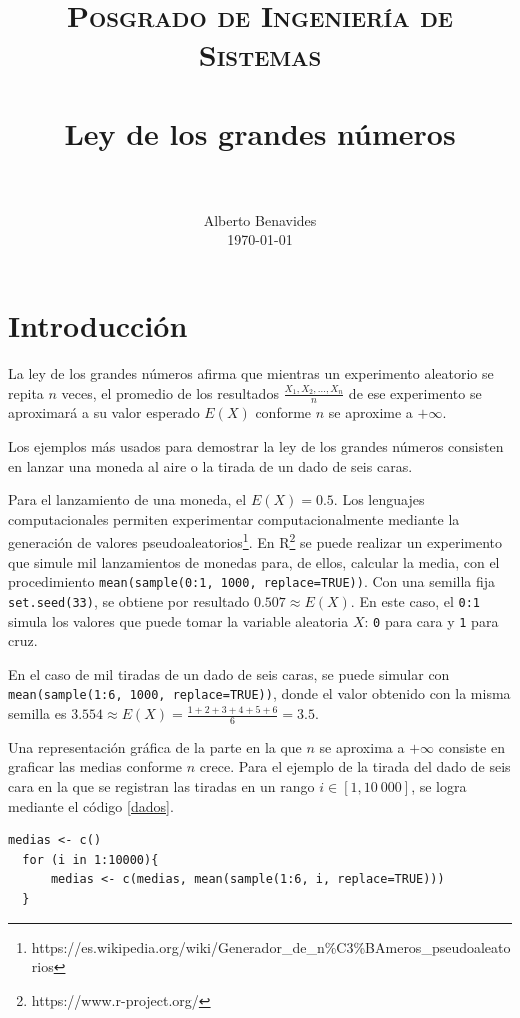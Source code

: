 \documentclass[paper=leter, fontsize=11pt]{scrartcl}
\title{
		\usefont{OT1}{bch}{b}{n}
		\normalfont \normalsize \textsc{Posgrado de Ingeniería de Sistemas} \\ [25pt]
		\horrule{0.5pt} \\[0.4cm]
		\huge Ley de los grandes números \\
		\horrule{2pt} \\[0.5cm]
}
\author{
		\normalfont 								\normalsize
        Alberto Benavides\\[-3pt]		\normalsize
        \today
}
\date{}
\begin{document}
 
\maketitle

\section{Introducción}

La ley de los grandes números afirma que mientras un experimento aleatorio se repita $n$ veces, el promedio de los resultados $\frac{X_1, X_2, \ldots, X_n}{n}$ de ese experimento se aproximará a su valor esperado $E(X)$ conforme $n$ se aproxime a $+\infty$.

Los ejemplos más usados para demostrar la ley de los grandes números consisten en lanzar una moneda al aire o la tirada de un dado de seis caras.

Para el lanzamiento de una moneda, el $E(X) = 0.5$. Los lenguajes computacionales permiten experimentar computacionalmente mediante la generación de valores pseudoaleatorios\footnote{https://es.wikipedia.org/wiki/Generador_de_n\%C3\%BAmeros_pseudoaleatorios}. En R\footnote{https://www.r-project.org/} se puede realizar un experimento que simule mil lanzamientos de monedas para, de ellos, calcular la media, con el procedimiento \texttt{mean(sample(0:1, 1000, replace=TRUE))}. Con una semilla fija \texttt{set.seed(33)}, se obtiene por resultado $0.507 \approx E(X)$. En este caso, el \texttt{0:1} simula los valores que puede tomar la variable aleatoria $X$: \texttt{0} para cara y \texttt{1} para cruz. 

En el caso de mil tiradas de un dado de seis caras, se puede simular con \texttt{mean(sample(1:6, 1000, replace=TRUE))}, donde el valor obtenido con la misma semilla es $3.554 \approx  E(X) = \frac{1 + 2 + 3 + 4 + 5 + 6}{6} = 3.5$.

Una representación gráfica de la parte en la que $n$ se aproxima a $+\infty$ consiste en graficar las medias conforme $n$ crece. Para el ejemplo de la tirada del dado de seis cara en la que se registran las tiradas en un rango $i \in [1, 10\ 000]$, se logra mediante el código \ref{dados}.

\begin{lstlisting}[caption={Medias experimentales de las tiradas de un dado de seis caras}, captionpos=t, label=dados]
  medias <- c()
  for (i in 1:10000){
      medias <- c(medias, mean(sample(1:6, i, replace=TRUE)))
  }
\end{lstlisting}
\end{document}

